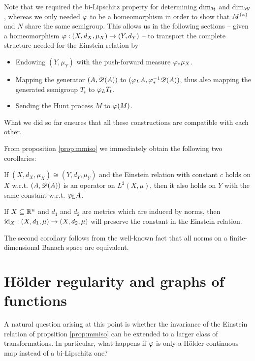 \begin{rem}\label{rem:ToS}
  Note that we required the bi-Lipschitz property for determining 
  $\dim_{\mathcal{H}}$ and $\dim_{\mathcal{W}}$, whereas we only needed $\varphi$ to be a homeomorphism in order to show that $M^{(\varphi)}$ and $N$ share the same semigroup. This allows us in the following sections -- given a homeomorphism $\varphi:(X,d_X,\mu_X)\to(Y,d_Y)$ -- to transport the complete structure needed for the Einstein relation by 
  \begin{itemize}
    \item Endowing $(Y,\mu_Y)$ with the push-forward measure $\varphi_*\mu_X$.
    \item Mapping the generator $(A,\mathscr{D}(A))$ to 
    $(\varphi_LA,\varphi_*^{-1}\mathscr{D}(A))$, thus also mapping the generated semigroup $T_t$ to $\varphi_LT_t$.
    \item Sending the Hunt process $M$ to $\varphi(M)$. 
  \end{itemize}
  What we did so far ensures that all these constructions are compatible with each other. 
\end{rem}

From proposition \ref{prop:mmiso} we immediately obtain the following two corollaries:
\begin{cor}
  If $(X,d_X,\mu_X)\cong(Y,d_Y,\mu_Y)$ and the Einstein relation with constant $c$ holds on $X$ w.r.t. $(A,\mathscr{D}(A))$ is an operator on $L^2(X,\mu)$, then it also holds on $Y$ with the same constant w.r.t. $\varphi_{\mathbb{L}}A$. 
\end{cor}
\begin{cor}
  If $X\subseteq\mathbb{R}^n$ and $d_1$ and $d_2$ are metrics which are induced by norms, then $\operatorname{id}_X:(X,d_1,\mu)\to(X,d_2,\mu)$ will preserve the constant in the Einstein relation.
\end{cor}
The second corollary follows from the well-known fact that all norms on a finite-dimensional Banach space are equivalent. 



\section{H\"older regularity and graphs of functions}

A natural question arising at this point is whether the invariance of the Einstein relation of propsition \ref{prop:mmiso} can be extended to a larger class of transformations. In particular, what happens if $\varphi$ is only a H\"older continuous map instead of a bi-Lipschitz one?

